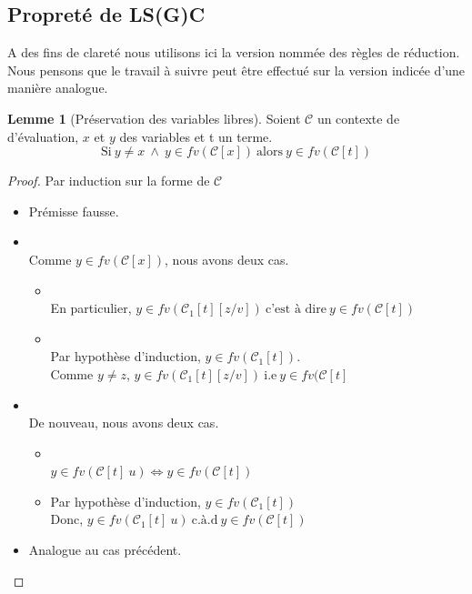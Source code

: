 \documentclass[11pt,a4paper]{article}
\theoremstyle{definition}
\newtheorem{lemma}[theorem]{Lemme}
\begin{document}
\subsection{Propreté de LS(G)C}
A des fins de clareté nous utilisons ici la version nommée des règles de réduction. Nous pensons que le travail à suivre peut être effectué sur la version indicée d'une manière analogue.
\begin{lemma}[Préservation des variables libres]
  \label{lemmapresfv}
  Soient $\mathcal{C}$ un contexte de d'évaluation, $x$ et $y$ des variables et t un terme.
  \[
    \text{Si}~y \neq x~\wedge~y\in fv(\mathcal{C}[x])~\text{alors}~y \in fv(\mathcal{C}[t])
  \]
\end{lemma}
\begin{proof}
Par induction sur la forme de $\mathcal{C}$
 \begin{itemize}
    \item {} Prémisse fausse.
    \item {}\\
      Comme $y\in fv(\mathcal{C}[x])$, nous avons deux cas.
      \begin{itemize}
        \item {}\\ 
          En particulier, $y \in fv(\mathcal{C}_1[t][z/v])~\text{c'est à dire}~y \in fv(\mathcal{C}[t])$
        \item {}\\
          Par hypothèse d'induction, $y\in fv(\mathcal{C}_1[t])$.\\
          Comme $y \neq z$, $y\in fv(\mathcal{C}_1[t][z/v])~\text{i.e}~y \in fv(\mathcal{C}[t]$ 
      \end{itemize}
    \item {}\\
      De nouveau, nous avons deux cas.
      \begin{itemize}
        \item {}\\
          $ y \in fv(\mathcal{C}[t]~u) \Leftrightarrow y \in fv(\mathcal{C}[t])$
        \item {}
          Par hypothèse d'induction, $y \in fv(\mathcal{C}_1[t])$\\ 
          Donc, $y \in fv(\mathcal{C}_1[t]~u)~\text{c.à.d}~y \in fv(\mathcal{C}[t])$
      \end{itemize}
    \item {} Analogue au cas précédent.
  \end{itemize} 
\end{proof}
\end{document}
